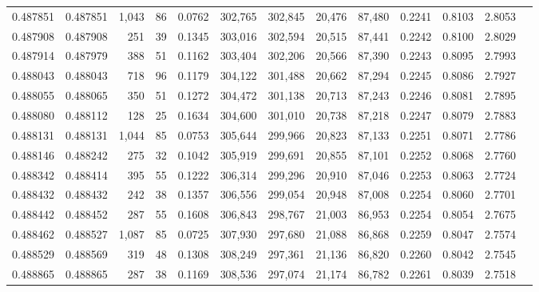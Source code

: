 \begin{tabular}{rrrrrrrrrrrrr}
0.487851 & 0.487851 & 1,043 &    86 &                                     0.0762 & 302,765 & 302,845 &  20,476 &  87,480 & 0.2241 & 0.8103 & 2.8053 \\
0.487908 & 0.487908 &   251 &    39 &                                     0.1345 & 303,016 & 302,594 &  20,515 &  87,441 & 0.2242 & 0.8100 & 2.8029 \\
0.487914 & 0.487979 &   388 &    51 &                                     0.1162 & 303,404 & 302,206 &  20,566 &  87,390 & 0.2243 & 0.8095 & 2.7993 \\
0.488043 & 0.488043 &   718 &    96 &                                     0.1179 & 304,122 & 301,488 &  20,662 &  87,294 & 0.2245 & 0.8086 & 2.7927 \\
0.488055 & 0.488065 &   350 &    51 &                                     0.1272 & 304,472 & 301,138 &  20,713 &  87,243 & 0.2246 & 0.8081 & 2.7895 \\
0.488080 & 0.488112 &   128 &    25 &                                     0.1634 & 304,600 & 301,010 &  20,738 &  87,218 & 0.2247 & 0.8079 & 2.7883 \\
0.488131 & 0.488131 & 1,044 &    85 &                                     0.0753 & 305,644 & 299,966 &  20,823 &  87,133 & 0.2251 & 0.8071 & 2.7786 \\
0.488146 & 0.488242 &   275 &    32 &                                     0.1042 & 305,919 & 299,691 &  20,855 &  87,101 & 0.2252 & 0.8068 & 2.7760 \\
0.488342 & 0.488414 &   395 &    55 &                                     0.1222 & 306,314 & 299,296 &  20,910 &  87,046 & 0.2253 & 0.8063 & 2.7724 \\
0.488432 & 0.488432 &   242 &    38 &                                     0.1357 & 306,556 & 299,054 &  20,948 &  87,008 & 0.2254 & 0.8060 & 2.7701 \\
0.488442 & 0.488452 &   287 &    55 &                                     0.1608 & 306,843 & 298,767 &  21,003 &  86,953 & 0.2254 & 0.8054 & 2.7675 \\
0.488462 & 0.488527 & 1,087 &    85 &                                     0.0725 & 307,930 & 297,680 &  21,088 &  86,868 & 0.2259 & 0.8047 & 2.7574 \\
0.488529 & 0.488569 &   319 &    48 &                                     0.1308 & 308,249 & 297,361 &  21,136 &  86,820 & 0.2260 & 0.8042 & 2.7545 \\
0.488865 & 0.488865 &   287 &    38 &                                     0.1169 & 308,536 & 297,074 &  21,174 &  86,782 & 0.2261 & 0.8039 & 2.7518 \\

\end{tabular}

